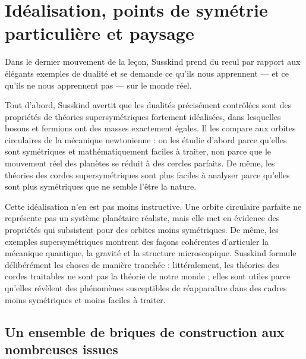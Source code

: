 \begin{classroomqa}
\end{classroomqa}

\section{Idéalisation, points de symétrie particulière et paysage}

Dans le dernier mouvement de la leçon, Susskind prend du recul par rapport aux élégants exemples de dualité et se demande ce qu’ils nous apprennent — et ce qu’ils ne nous apprennent pas — sur le monde réel.

Tout d’abord, Susskind avertit que les dualités précisément contrôlées sont des propriétés de théories supersymétriques fortement idéalisées, dans lesquelles bosons et fermions ont des masses exactement égales. Il les compare aux orbites circulaires de la mécanique newtonienne : on les étudie d’abord parce qu’elles sont symétriques et mathématiquement faciles à traiter, non parce que le mouvement réel des planètes se réduit à des cercles parfaits. De même, les théories des cordes supersymétriques sont plus faciles à analyser parce qu’elles sont plus symétriques que ne semble l’être la nature.

Cette idéalisation n’en est pas moins instructive. Une orbite circulaire parfaite ne représente pas un système planétaire réaliste, mais elle met en évidence des propriétés qui subsistent pour des orbites moins symétriques. De même, les exemples supersymétriques montrent des façons cohérentes d’articuler la mécanique quantique, la gravité et la structure microscopique. Susskind formule délibérément les choses de manière tranchée : littéralement, les théories des cordes traitables ne sont pas la théorie de notre monde ; elles sont utiles parce qu’elles révèlent des phénomènes susceptibles de réapparaître dans des cadres moins symétriques et moins faciles à traiter.

\subsection{Un ensemble de briques de construction aux nombreuses issues}

